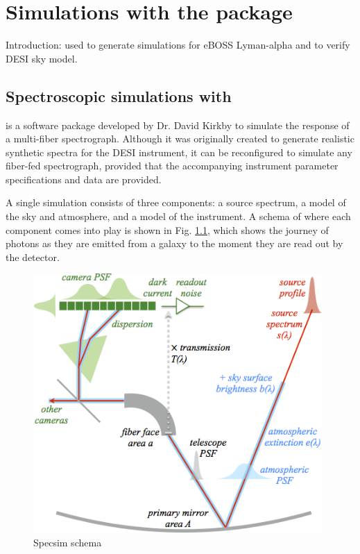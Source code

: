\chapter{Simulations with the  package}

Introduction: used to generate simulations for eBOSS Lyman-alpha and to verify DESI sky model. 

\section{Spectroscopic simulations with }

 \cite{Kirkby_21} is a software package developed by Dr. David Kirkby to simulate the response of a multi-fiber spectrograph. Although it was originally created to generate realistic synthetic spectra for the DESI instrument, it can be reconfigured to simulate any fiber-fed spectrograph, provided that the accompanying instrument parameter specifications and data are provided.

A single simulation consists of three components: a source spectrum, a model of the sky and atmosphere, and a model of the instrument. A schema of where each component comes into play is shown in Fig. \ref{fig:schema}, which shows the journey of photons as they are emitted from a galaxy to the moment they are read out by the detector.

\begin{figure}[h]
\centering
\includegraphics[width=11cm]{images/specsim/overview.png}
\caption{Specsim schema \cite{Kirkby_21}}
\label{fig:schema}
\end{figure}

